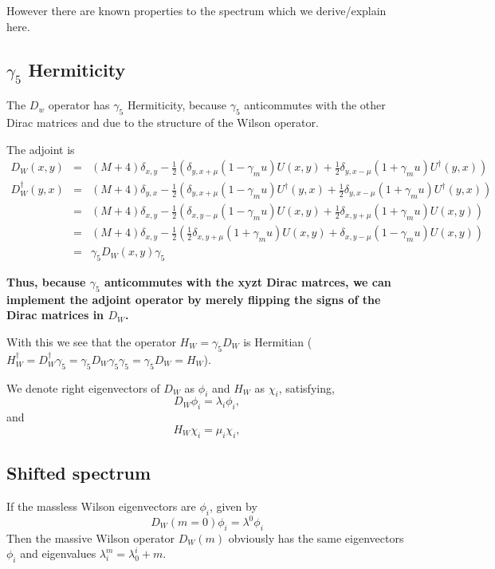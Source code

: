 \documentclass[letter,10pt]{report}
\begin{document}
However there are known properties to the spectrum which we derive/explain here.

\subsection{$\gamma_5$ Hermiticity}

The $D_w$ operator has $\gamma_5$ Hermiticity, because $\gamma_5$ anticommutes with the other Dirac matrices and due to the
structure of the Wilson operator.

The adjoint is
\begin{eqnarray}
  D_W(x,y) &=& (M+4)\delta_{x,y} - \frac{1}{2}\left( \delta_{y,x+\mu} (1-\gamma_mu) U(x,y)  + \frac{1}{2} \delta_{y,x-\mu} (1+\gamma_mu) U^\dagger(y,x) \right)\\
  D_W^\dagger(y,x)
  &=& (M+4)\delta_{y,x} - \frac{1}{2}\left( \delta_{y,x+\mu} (1-\gamma_mu) U^\dagger(y,x)  + \frac{1}{2} \delta_{y,x-\mu} (1+\gamma_mu) U^\dagger(y,x) \right)\\
  &=& (M+4)\delta_{x,y} - \frac{1}{2}\left( \delta_{x,y-\mu} (1-\gamma_mu) U(x,y)  + \frac{1}{2} \delta_{x,y+\mu} (1+\gamma_mu) U(x,y) \right)\\
  &=& (M+4)\delta_{x,y} - \frac{1}{2}\left( \frac{1}{2} \delta_{x,y+\mu} (1+\gamma_mu) U(x,y) + \delta_{x,y-\mu} (1-\gamma_mu) U(x,y)  \right)\\
  &=&  \gamma_5 D_W(x,y) \gamma_5
\end{eqnarray}

{\bf Thus, because $\gamma_5$ anticommutes with the xyzt Dirac matrces, 
we can implement the adjoint operator by merely flipping the signs of the Dirac matrices in $D_W$.}

With this we see that the operator
$
H_W = \gamma_5 D_W 
$
is Hermitian 
($
H_W^\dagger =  D_W^\dagger \gamma_5 =  \gamma_5 D_W\gamma_5\gamma_5 =  \gamma_5 D_W = H_W
$).


We denote right eigenvectors of $D_W$ as $\phi_i$ and $H_W$ as $\chi_i$,
satisfying,
$$
D_W \phi_i = \lambda_i \phi_i,
$$
and
$$
H_W \chi_i = \mu_i \chi_i,
$$

\subsection{Shifted spectrum}

If the massless Wilson eigenvectors are $\phi_i$, given by
$$
D_W(m=0) \phi_i = \lambda^0 \phi_i
$$
Then the massive Wilson operator $D_W(m)$ obviously has the same eigenvectors $\phi_i$ and eigenvalues $\lambda^m_i = \lambda_0^i+m$.
\end{document}
